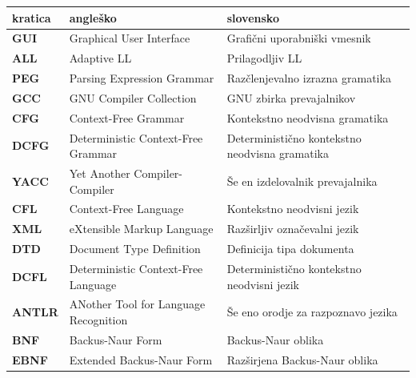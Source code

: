 \documentclass[a4paper, 12pt, tikz, border=5]{book}
\begin{document}

\noindent\begin{tabular}{p{}|p{}|p{}}    %
  {\bf kratica} & {\bf angleško} & {\bf slovensko} \\ \hline
  {\bf GUI} & Graphical User Interface & Grafični uporabniški vmesnik \\
  {\bf ALL} & Adaptive LL & Prilagodljiv LL \\
  {\bf PEG} & Parsing Expression Grammar & Razčlenjevalno izrazna gramatika \\
  {\bf GCC} & GNU Compiler Collection & GNU zbirka prevajalnikov \\
  {\bf CFG} & Context-Free Grammar & Kontekstno neodvisna gramatika \\
  {\bf DCFG} & Deterministic Context-Free Grammar & Deterministično kontekstno neodvisna gramatika \\
  {\bf YACC} & Yet Another Compiler-Compiler & Še en izdelovalnik prevajalnika \\
  {\bf CFL} & Context-Free Language & Kontekstno neodvisni jezik \\
  {\bf XML} & eXtensible Markup Language & Razširljiv označevalni jezik \\
  {\bf DTD} & Document Type Definition & Definicija tipa dokumenta \\
  {\bf DCFL} & Deterministic Context-Free Language & Deterministično kontekstno neodvisni jezik \\
  {\bf ANTLR} & ANother Tool for Language Recognition & Še eno orodje za razpoznavo jezika \\
  {\bf BNF} & Backus-Naur Form & Backus-Naur oblika \\
  {\bf EBNF} & Extended Backus-Naur Form & Razširjena Backus-Naur oblika \\

\end{tabular}
\end{document}

